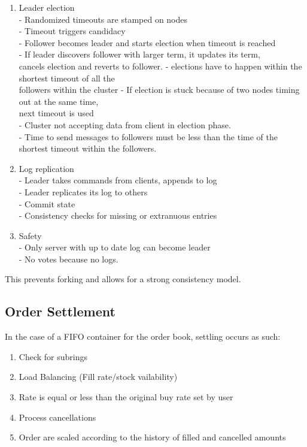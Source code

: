 \documentclass[]{article}
\begin{document}
\begin{enumerate}
	\item Leader election\\
	- Randomized timeouts are stamped on nodes\\
	- Timeout triggers candidacy\\
	- Follower becomes leader and starts election when timeout is reached\\
	- If leader discovers follower with larger term, it updates its term,\\  cancels election and reverts to follower.
	- elections have to happen within the shortest timeout of all the\\ followers within the cluster
	- If election is stuck because of two nodes timing out at the same time,\\ 
	next timeout is used\\
	- Cluster not accepting data from client in election phase.\\
	- Time to send messages to followers must be less than the time
	of the shortest timeout within the followers. 
	\item Log replication\\
		- Leader takes commands from clients, appends to log\\
		- Leader replicates its log to others\\
		- Commit state\\
		- Consistency checks for missing or extranuous entries\\
	\item Safety\\
	- Only server with up to date log can become leader\\
	- No votes because no logs.\\
\end{enumerate}
This prevents forking and allows for a strong consistency model.
\paragraph{}

\subsection{Order Settlement}
In the case of a FIFO container for the order book,
settling occurs as such:
\begin{enumerate}
	\item Check for subrings
	\item Load Balancing (Fill rate/stock vailability)
	\item Rate is equal or less than the original buy rate set by user
	\item Process cancellations
	\item Order are scaled according to the history of filled and cancelled amounts 
\end{enumerate}	
	
\end{document}
